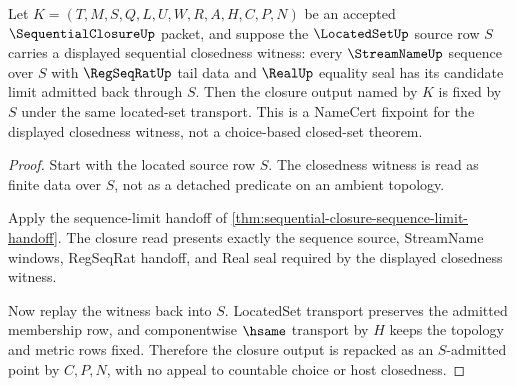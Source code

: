 \begin{theorem}
\label{thm:sequentialclosure-closed-set-fixpoint}
Let $K=(T,M,S,Q,L,U,W,R,A,H,C,P,N)$ be an accepted $\SequentialClosureUp$ packet, and suppose the $\LocatedSetUp$ source row $S$ carries a displayed sequential closedness witness: every $\StreamNameUp$ sequence over $S$ with $\RegSeqRatUp$ tail data and $\RealUp$ equality seal has its candidate limit admitted back through $S$. Then the closure output named by $K$ is fixed by $S$ under the same located-set transport. This is a NameCert fixpoint for the displayed closedness witness, not a choice-based closed-set theorem.
\end{theorem}
\begin{proof}
Start with the located source row $S$. The closedness witness is read as finite data over $S$, not as a detached predicate on an ambient topology.

Apply the sequence-limit handoff of \autoref{thm:sequential-closure-sequence-limit-handoff}. The closure read presents exactly the sequence source, StreamName windows, RegSeqRat handoff, and Real seal required by the displayed closedness witness.

Now replay the witness back into $S$. LocatedSet transport preserves the admitted membership row, and componentwise $\hsame$ transport by $H$ keeps the topology and metric rows fixed. Therefore the closure output is repacked as an $S$-admitted point by $C,P,N$, with no appeal to countable choice or host closedness.
\end{proof}


